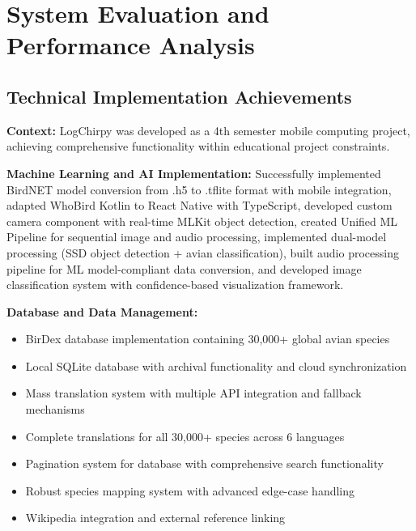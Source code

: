 \chapter{System Evaluation and Performance Analysis}

\section{Technical Implementation Achievements}

\textbf{Context:} LogChirpy was developed as a 4th semester mobile computing project, achieving comprehensive functionality within educational project constraints.

\textbf{Machine Learning and AI Implementation:} Successfully implemented BirdNET model conversion from .h5 to .tflite format with mobile integration, adapted WhoBird Kotlin to React Native with TypeScript, developed custom camera component with real-time MLKit object detection, created Unified ML Pipeline for sequential image and audio processing, implemented dual-model processing (SSD object detection + avian classification), built audio processing pipeline for ML model-compliant data conversion, and developed image classification system with confidence-based visualization framework.

\textbf{Database and Data Management:}
\begin{itemize}
    \item BirDex database implementation containing 30,000+ global avian species
    \item Local SQLite database with archival functionality and cloud synchronization
    \item Mass translation system with multiple API integration and fallback mechanisms
    \item Complete translations for all 30,000+ species across 6 languages
    \item Pagination system for database with comprehensive search functionality
    \item Robust species mapping system with advanced edge-case handling
    \item Wikipedia integration and external reference linking
\end{itemize}

